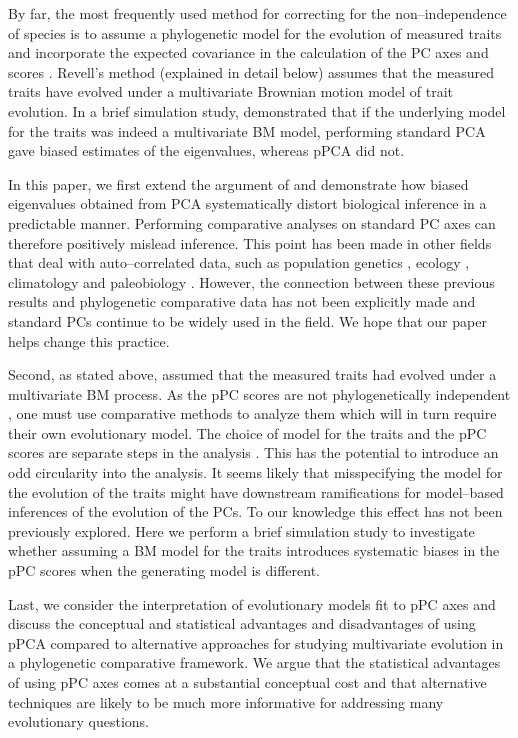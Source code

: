 \documentclass[a4paper,11pt]{article}
\begin{document}
By far, the most frequently used method for correcting for the non--independence of species is to assume a phylogenetic model for the evolution of measured traits and incorporate the expected covariance in the calculation of the PC axes and scores \citep{Revell2008}. Revell's method (explained in detail below) assumes that the measured traits have evolved under a multivariate Brownian motion \citep[BM;][]{Edwards1964} model of trait evolution. In a brief simulation study, \citet{Revell2008} demonstrated that if the underlying model for the traits was indeed a multivariate BM model, performing standard PCA gave biased estimates of the eigenvalues, whereas pPCA did not.

In this paper, we first extend the argument of \citet{Revell2008} and demonstrate how biased eigenvalues obtained from PCA systematically distort biological inference in a predictable manner. Performing comparative analyses on standard PC axes can therefore positively mislead inference. This point has been made in other fields that deal with auto--correlated data, such as population genetics \citep{Novembre}, ecology \citep{Podani2002}, climatology \citep{Richman1986} and paleobiology \citep{Bookstein2012}. However, the connection between these previous results and phylogenetic comparative data has not been explicitly made and standard PCs continue to be widely used in the field. We hope that our paper helps change this practice.

Second, as stated above, \citet{Revell2008} assumed that the measured traits had evolved under a multivariate BM process. As the pPC scores are not phylogenetically independent \citep[][see below]{Revell2008, Polly2013}, one must use comparative methods to analyze them which will in turn require their own evolutionary model. The choice of model for the traits and the pPC scores are separate steps in the analysis \citep{Revell2008}. 
This has the potential to introduce an odd circularity into the analysis. It seems likely that misspecifying the model for the evolution of the traits might have downstream ramifications for model--based inferences of the evolution of the PCs. To our knowledge this effect has not been previously explored. Here we perform a brief simulation study to investigate whether assuming a BM model for the traits introduces systematic biases in the pPC scores when the generating model is different.  

Last, we consider the interpretation of evolutionary models fit to pPC axes and discuss the conceptual and statistical advantages and disadvantages of using pPCA compared to alternative approaches for studying multivariate evolution in a phylogenetic comparative framework. We argue that the statistical advantages of using pPC axes comes at a substantial conceptual cost and that alternative techniques are likely to be much more informative for addressing many evolutionary questions.
\end{document}
